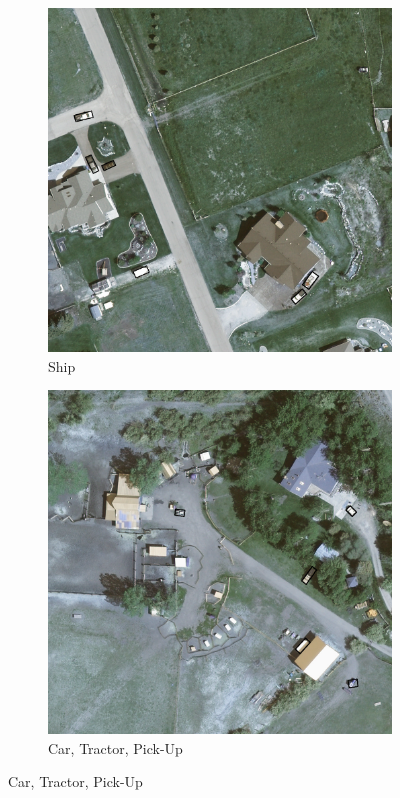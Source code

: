 \begin{figure}[h!]
    \begin{subfigure}[t]{0.38\textwidth}
        \centering
        \includegraphics[width=\linewidth]{images/015Results/02perm_exp/comp_images/ground_truth/509.png}
        \caption{Ship}
    \end{subfigure}
    \begin{subfigure}[t]{0.38\textwidth}
        \centering
        \includegraphics[width=\linewidth]{images/015Results/02perm_exp/comp_images/ground_truth/523.png}
        \caption{Car, Tractor, Pick-Up}
    \end{subfigure}
    

\end{figure}
